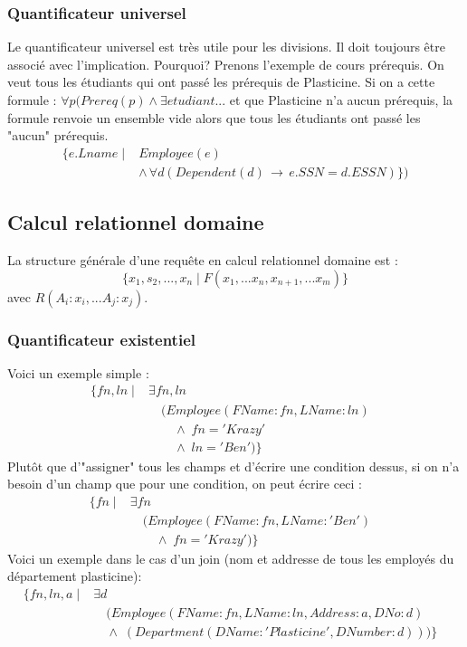 \documentclass[a4paper]{article}
\begin{document}
  \subsubsection{Quantificateur universel}
  Le quantificateur universel est très utile pour les divisions.
  Il doit toujours être associé avec l'implication. Pourquoi? Prenons l'exemple
  de cours prérequis. On veut tous les étudiants qui ont passé les prérequis
  de Plasticine. Si on a cette formule : $\forall p (Prereq(p) \land \exists etudiant ...$ et que Plasticine n'a aucun prérequis, la formule renvoie un ensemble
  vide alors que tous les étudiants ont passé les "aucun" prérequis.
  \begin{align*}
    \{e.Lname\; | \; &Employee(e)\\
    &\land\, \forall d (Dependent(d) \,\rightarrow\, e.SSN = d.ESSN)\} )
  \end{align*}

  \subsection{Calcul relationnel domaine}
  La structure générale d'une requête en calcul relationnel domaine est :
  $$ \{x_1, s_2,...,x_n\; | \; F(x_1, ... x_n,x_{n+1},...x_{m})\} $$
  avec $R(A_i:x_i,...A_j:x_j)$.

  \subsubsection{Quantificateur existentiel}
  Voici un exemple simple :
  \begin{align*}
    \{fn, ln\; |\; &\exists fn, ln & \\
    &\quad(Employee(FName:fn, LName:ln)\\
    &\quad\quad\land\;fn='Krazy'\\
    &\quad\quad\land\; ln='Ben')\}
  \end{align*}
  Plutôt que d'"assigner" tous les champs et d'écrire une condition dessus,
  si on n'a besoin d'un champ que pour une condition, on peut écrire ceci :
  \begin{align*}
    \{fn\; |\; &\exists fn & \\
    &\quad(Employee(FName:fn, LName:'Ben')\\
    &\quad\quad\land\;fn='Krazy')\}
  \end{align*}
  Voici un exemple dans le cas d'un join (nom et addresse de tous les employés
  du département plasticine):
  \begin{align*}
    \{fn, ln, a\; |\; &\exists d & \\
    &\quad(Employee(FName:fn, LName:ln, Address:a, DNo:d)\\
    &\quad\land\;(Department(DName:'Plasticine', DNumber:d)))\}
  \end{align*}
\end{document}

